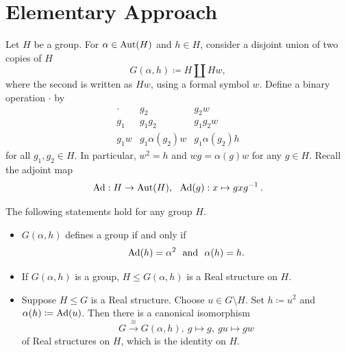 \section{Elementary Approach}\label{sect:elementarydesc}
Let $H$ be a group. For $\alpha \in \operatorname{Aut}(H)$ and $h \in H$, consider a disjoint union of two copies of $H$
\[
G(\alpha, h) \coloneqq H \coprod Hw,
\]
where the second is written as $Hw$, using a formal symbol $w$. 
Define a binary operation $\cdot$ by
\[
\begin{array}{c|cc}
   \cdot & g_2 & g_2 w \\ \hline
   g_1   & g_1 g_2 & g_1 g_2 w \\
   g_1 w & g_1 \alpha(g_2) w & g_1 \alpha(g_2) h
\end{array}
\]
for all $g_1, g_2 \in H$. In particular, $w^2 = h$ and $w g = \alpha(g) w$ for any $g \in H$. Recall the adjoint map
\[
\operatorname{Ad} : H \rightarrow \operatorname{Aut} (H), \ \ \operatorname{Ad} (g): x \mapsto gxg^{-1} \, . 
\]
\begin{lemma}\label{lem:elementary1}
	The following statements hold for any group $H$. 
	\begin{itemize}
        \item $G(\alpha, h)$ defines a group if and only if
          \begin{equation} \label{Conditions_alpha_h}
            \operatorname{Ad}(h) = \alpha^2 \ \mbox{ and } \ \alpha(h) = h.
            \end{equation}
	\item If  $G(\alpha, h)$ is a group, $H \leq G(\alpha, h)$ is a Real structure on $H$.
	\item Suppose $H \leq {G}$ is a Real structure. Choose  $u \in {G} \setminus H$. Set
          $h \coloneqq u^2$ and $\alpha(h) \coloneqq \operatorname{Ad}(u)$. Then there is a canonical isomorphism
          \[ {G} \xrightarrow{\cong} G(\alpha, h), \ g\mapsto g, \ gu \mapsto gw\]
          of Real structures on $H$, which is the identity on $H$.
\end{itemize}
\end{lemma}

